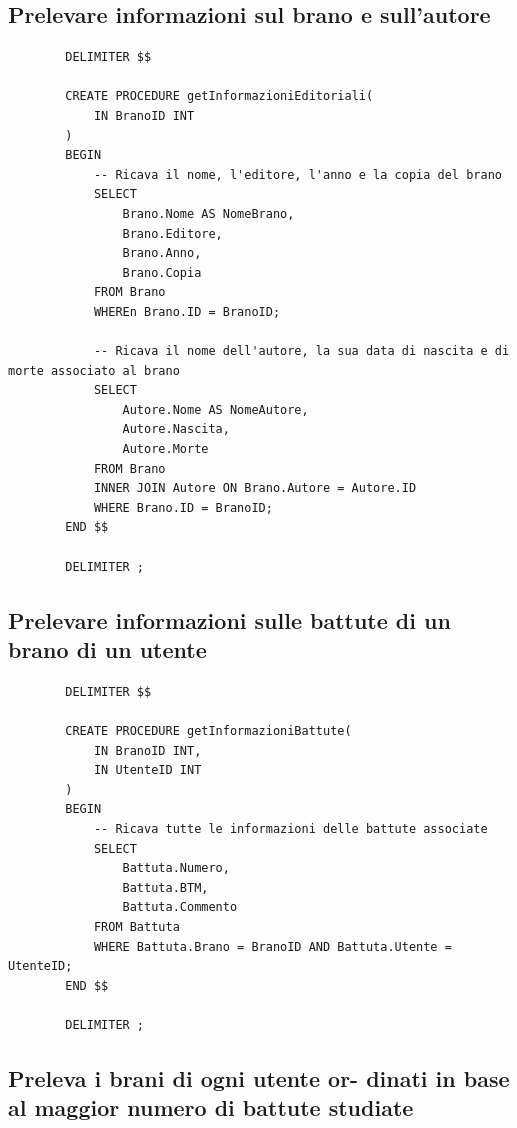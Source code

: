 \documentclass{article}
\begin{document}
    \subsection{Prelevare informazioni sul brano
    e sull’autore}
    
    \begin{verbatim}
        DELIMITER $$

        CREATE PROCEDURE getInformazioniEditoriali(
            IN BranoID INT
        )
        BEGIN
            -- Ricava il nome, l'editore, l'anno e la copia del brano
            SELECT
                Brano.Nome AS NomeBrano,
                Brano.Editore,
                Brano.Anno,
                Brano.Copia
            FROM Brano
            WHEREn Brano.ID = BranoID;

            -- Ricava il nome dell'autore, la sua data di nascita e di morte associato al brano
            SELECT
                Autore.Nome AS NomeAutore,
                Autore.Nascita,
                Autore.Morte
            FROM Brano
            INNER JOIN Autore ON Brano.Autore = Autore.ID
            WHERE Brano.ID = BranoID;
        END $$

        DELIMITER ;
    \end{verbatim}
    
    \subsection{Prelevare informazioni sulle battute di un brano di un utente}
    
    \begin{verbatim}
        DELIMITER $$

        CREATE PROCEDURE getInformazioniBattute(
            IN BranoID INT,
            IN UtenteID INT
        )
        BEGIN
            -- Ricava tutte le informazioni delle battute associate
            SELECT
                Battuta.Numero,
                Battuta.BTM,
                Battuta.Commento
            FROM Battuta
            WHERE Battuta.Brano = BranoID AND Battuta.Utente = UtenteID;
        END $$

        DELIMITER ;
    \end{verbatim}
    
    \subsection{Preleva i brani di ogni utente or-
    dinati in base al maggior numero
    di battute studiate}
\end{document}
